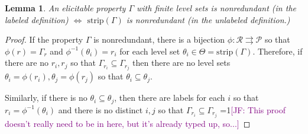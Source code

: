 \documentclass[12pt]{article}
\newcommand{\Comments}{1}
\newcommand{\mynote}[2]{\ifnum\Comments=1\textcolor{#1}{#2}\fi}
\newcommand{\jessie}[1]{\mynote{purple}{[JF: #1]}}
\renewcommand{\P}{\mathcal{P}}
\newcommand{\R}{\mathcal{R}}
\newcommand{\toto}{\rightrightarrows}
\newcommand{\strip}{\mathrm{strip}}
\newtheorem{lemma}{Lemma}
\begin{document}
\begin{lemma}\label{lem:nonredundant-defs-equivalent}
	An elicitable property $\Gamma$ with finite level sets is nonredundant (in the labeled definition) $\iff$ $\strip(\Gamma)$ is nonredundant (in the unlabeled definition.)
\end{lemma}
\begin{proof}
	If the property $\Gamma$ is nonredundant, there is a bijection $\phi:\R \toto \P$ so that $\phi(r) = \Gamma_r$ and $\phi^{-1}(\theta_i) = r_i$ for each level set $\theta_i \in \Theta = \strip(\Gamma)$.
	Therefore, if there are no $r_i, r_j$ so that $\Gamma_{r_i} \subseteq \Gamma_{r_j}$ then there are no level sets $\theta_i = \phi(r_i), \theta_j = \phi(r_j)$ so that $\theta_i \subseteq \theta_j$.
	
	Similarly, if there is no $\theta_i \subseteq \theta_j$, then there are labels for each $i$ so that $r_i = \phi^{-1}(\theta_i)$ and there is no distinct $i,j$ so that $\Gamma_{r_i} \subseteq \Gamma_{r_j}$ 	
	\jessie{This proof doesn't really need to be in here, but it's already typed up, so...}
	
%
%		
%		
%		
%
	
\end{proof}
\end{document}
